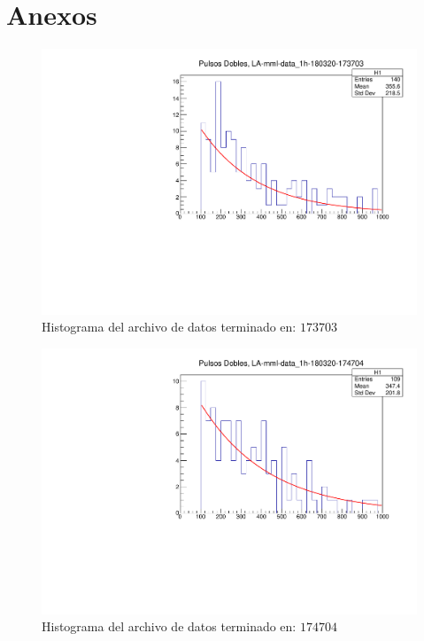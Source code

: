 \documentclass[conference]{IEEEtran}
\begin{document}
\section{Anexos}
		\begin{figure}[H]
            \centering
            \includegraphics[scale=0.4]{./Imagenes/file1.pdf}
            \caption{Histograma del archivo de datos terminado en: $173703$}
            \label{fig:file1}
        \end{figure}  
        \begin{figure}[H]
            \centering
            \includegraphics[scale=0.4]{./Imagenes/file2.pdf}
            \caption{Histograma del archivo de datos terminado en: $174704$}
            \label{fig:file2}
        \end{figure} 
\end{document}
